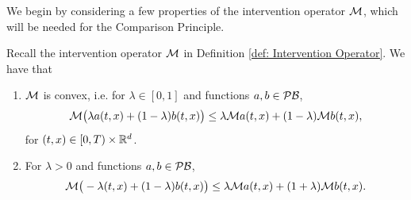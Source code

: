 We begin by considering a few properties of the intervention operator $\mathcal{M}$, which will be needed for the Comparison Principle. 
\begin{lemma}
\label{lemma: Lemma 5.7 in Seydel}
    Recall the intervention operator $\mathcal{M}$ in Definition \ref{def: Intervention Operator}. We have that
    \begin{enumerate}[label=(\roman*)]
        \item $\mathcal{M}$ is convex, i.e. for $\lambda \in [0,1]$ and functions $a,b \in \mathcal{PB}$, 
        \begin{equation*}
            \mathcal{M} \big( \lambda a(t,x) + (1-\lambda) b(t,x) \big) \leq \lambda \mathcal{M} a(t,x) + (1-\lambda) \mathcal{M} b(t,x),
        \end{equation*}
        for $(t,x) \in [0,T) \times \mathbb{R}^d$.

        \item For $\lambda > 0$ and functions $a,b \in \mathcal{PB}$, 
        \begin{equation*}
            \mathcal{M} \big(- \lambda (t,x) + (1-\lambda)b(t,x) \big) \leq \lambda \mathcal{M} a(t,x) + (1+\lambda) \mathcal{M} b(t,x).
        \end{equation*}
    \end{enumerate}
\end{lemma}
